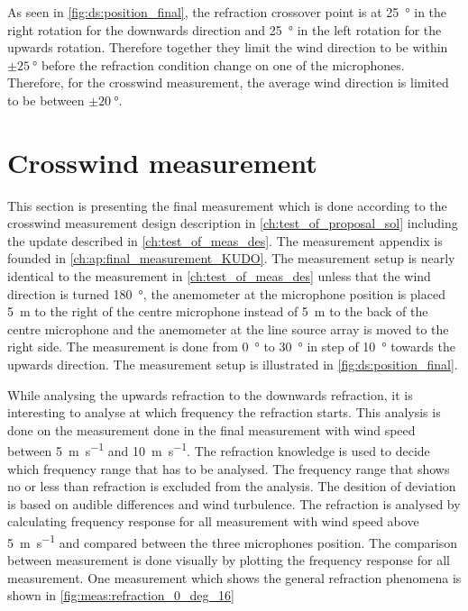 As seen in \autoref{fig:ds:position_final}, the refraction crossover point is at \SI{25}{\degree} in the right rotation for the downwards direction and \SI{25}{\degree} in the left rotation for the upwards rotation. Therefore together they limit the wind direction to be within $\pm\SI{25}{\degree}$ before the refraction condition change on one of the microphones. Therefore, for the crosswind measurement, the average wind direction is limited to be between $\pm\SI{20}{\degree}$. 


\section{Crosswind measurement}\label{mes:kudo:cross_mes}
This section is presenting the final measurement which is done according to the crosswind measurement design description in \autoref{ch:test_of_proposal_sol} including the update described in \autoref{ch:test_of_meas_des}. The measurement appendix is founded in \autoref{ch:ap:final_measurement_KUDO}. The measurement setup is nearly identical to the measurement in \autoref{ch:test_of_meas_des} unless that the wind direction is turned \SI{180}{\degree}, the anemometer at the microphone position is placed \SI{5}{\meter} to the right of the centre microphone instead of \SI{5}{\meter} to the back of the centre microphone and the anemometer at the line source array is moved to the right side. The measurement is done from  \SI{0}{\degree} to  \SI{30}{\degree} in step of  \SI{10}{\degree} towards the upwards direction. The measurement setup is illustrated in \autoref{fig:ds:position_final}.




While analysing the upwards refraction to the downwards refraction, it is interesting to analyse at which frequency the refraction starts. This analysis is done on the measurement done in the final measurement with wind speed between \SI{5}{\meter\per\second} and \SI{10}{\meter\per\second}. The refraction knowledge is used to decide which frequency range that has to be analysed. The frequency range that shows no or less than  refraction is excluded from the analysis. The desition of  deviation is based on audible differences and wind turbulence. The refraction is analysed by calculating frequency response for all measurement with wind speed above \SI{5}{\meter\per\second} and compared between the three microphones position. The comparison between measurement is done visually by plotting the frequency response for all measurement. One measurement which shows the general refraction phenomena is shown in \autoref{fig:meas:refraction_0_deg_16}



